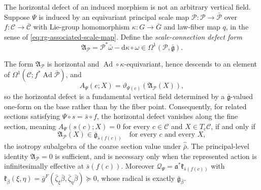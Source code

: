 The horizontal defect of an induced morphism is not an arbitrary vertical
field.  Suppose $\Psi$ is induced by an equivariant principal scale map
$\mathcal P:\mathscr P\to\bar{\mathscr P}$ over
$f:\mathcal C\to\bar{\mathcal C}$ with Lie-group homomorphism
$\kappa:G\to\bar G$ and law-fiber map $q$, in the sense of
\eqref{eq:rg-associated-scale-map}.  Define the
\emph{scale-connection defect form}
\begin{equation}
\mathfrak A_{\mathcal P}
=\mathcal P^*\bar\omega-\mathrm d\kappa\circ\omega
\in\Omega^1(\mathscr P,\bar{\mathfrak g}).
\label{eq:pb-scale-connection-defect}
\end{equation}

The form $\mathfrak A_{\mathcal P}$ is horizontal and
$\operatorname{Ad}\circ\kappa$-equivariant, hence descends to an element of
$\Omega^1(\mathcal C;f^*\operatorname{Ad}\bar{\mathscr P})$, and
\begin{equation}
A_\Psi(e;X)
=\vartheta_{\Psi(e)}\left(\mathfrak A_{\mathcal P}(X)\right),
\label{eq:pb-anomaly-fundamental-field}
\end{equation}
so the horizontal defect is a fundamental vertical field determined by a
$\bar{\mathfrak g}$-valued one-form on the base rather than by the fiber point.
Consequently, for related sections satisfying
$\Psi\circ s=\bar s\circ f$, the horizontal defect vanishes along the fine
section, meaning
$A_\Psi(s(c);X)=0$ for every $c\in\mathcal C$ and
$X\in T_c\mathcal C$, if and only if
\begin{equation}
\mathfrak A_{\mathcal P}(X)\in\bar{\mathfrak g}_{\bar s(f(c))}
\quad\text{for every }c\text{ and every }X,
\label{eq:pb-isotropy-criterion}
\end{equation}
the isotropy subalgebra of the coarse section value under
$\widehat{\bar\rho}$.  The principal-level identity $\mathfrak A_{\mathcal P}=0$
is sufficient, and is necessary only when the represented action is
infinitesimally effective at $\bar s(f(c))$.  Moreover
$\mathcal Q_\Psi=\mathfrak a^*\mathfrak k_{\bar s(f(c))}$ with
$\mathfrak k_{\bar\beta}(\xi,\eta)
=\bar g^F(\bar\zeta_\xi\bar\beta,\bar\zeta_\eta\bar\beta)\succeq0$, whose
radical is exactly $\bar{\mathfrak g}_{\bar\beta}$.  


